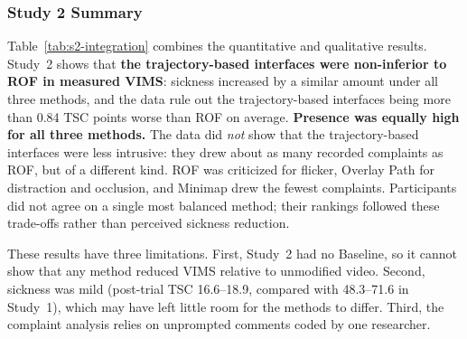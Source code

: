 \subsubsection{Study 2 Summary}

Table~\ref{tab:s2-integration} combines the quantitative and qualitative
results. Study~2 shows that \textbf{the trajectory-based interfaces were
non-inferior to ROF in measured VIMS}: sickness increased by a similar amount
under all three methods, and the data rule out the trajectory-based interfaces
being more than 0.84 TSC points worse than ROF on average. \textbf{Presence was
equally high for all three methods.} The data did \emph{not} show that the
trajectory-based interfaces were less intrusive: they drew about as many
recorded complaints as ROF, but of a different kind. ROF was criticized for
flicker, Overlay Path for distraction and occlusion, and Minimap drew the fewest
complaints. Participants did not agree on a single most balanced method; their
rankings followed these trade-offs rather than perceived sickness reduction.

These results have three limitations. First, Study~2 had no Baseline, so it
cannot show that any method reduced VIMS relative to unmodified video. Second,
sickness was mild (post-trial TSC 16.6--18.9, compared with 48.3--71.6 in
Study~1), which may have left little room for the methods to differ. Third,
the complaint analysis relies on unprompted comments coded by one researcher.
